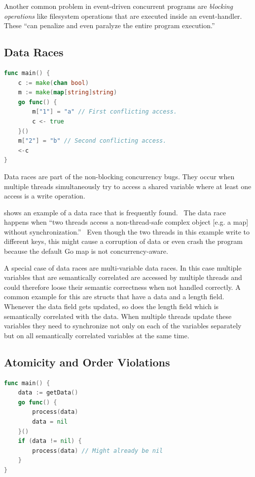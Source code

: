 \documentclass[conference]{IEEEtran}
\begin{document}
Another common problem in event-driven concurrent programs are \emph{blocking operations} like filesystem operations that are executed inside an event-handler.
These ``can penalize and even paralyze the entire program execution.''~\cite{tchamgoue2012testing}

\subsection{Data Races}
\begin{lstlisting}[float=h, language=Go, label=lst:race, caption=Data race -- based on \cite{goRaceDetector}]
func main() {
	c := make(chan bool)
	m := make(map[string]string)
	go func() {
		m["1"] = "a" // First conflicting access.
		c <- true
	}()
	m["2"] = "b" // Second conflicting access.
	<-c
}
\end{lstlisting}

Data races are part of the non-blocking concurrency bugs.
They occur when multiple threads simultaneously try to access a shared variable where at least one access is a write operation.~\cite{serebry2009threadsanitizer}

 shows an example of a data race that is frequently found.~\cite{serebry2009threadsanitizer}
The data race happens when ``two threads access a non-thread-safe complex object [e.g. a map] without synchronization.''~\cite{serebry2009threadsanitizer}
Even though the two threads in this example write to different keys, this might cause a corruption of data or even crash the program because the default Go map is not concurrency-aware.

A special case of data races are multi-variable data races.
In this case multiple variables that are semantically correlated are accessed by multiple threads and could therefore loose their semantic correctness when not handled correctly.
A common example for this are structs that have a data and a length field.
Whenever the data field gets updated, so does the length field which is semantically correlated with the data.
When multiple threads update these variables they need to synchronize not only on each of the variables separately but on all semantically correlated variables at the same time.~\cite{lu2007muvi}

\subsection{Atomicity and Order Violations}
\begin{lstlisting}[float=h, language=Go, label=lst:order, caption=Test-and-Use bug pattern -- Order violation]
func main() {
    data := getData()
    go func() {
        process(data)
        data = nil
    }()
    if (data != nil) {
        process(data) // Might already be nil
    }
}
\end{lstlisting}
\end{document}
